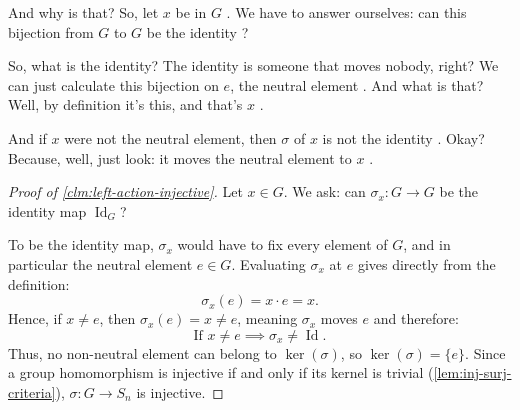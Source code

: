 \begin{proofWrapper}

\begin{speech}[01:14:37 - 01:15:27]
And why is that? So, let $x$ be in $G$ . We have to answer ourselves: can this bijection from $G$ to $G$ be the identity ?

So, what is the identity? The identity is someone that moves nobody, right? We can just calculate this bijection on $e$, the neutral element . And what is that? Well, by definition it's this, and that's $x$ .

And if $x$ were not the neutral element, then $\sigma$ of $x$ is not the identity . Okay? Because, well, just look: it moves the neutral element to $x$ .
\end{speech}

\begin{content}
\begin{proof}[Proof of \cref{clm:left-action-injective}]
Let $x \in G$. We ask: can $\sigma_x \colon G \to G$ be the identity map $\operatorname{Id}_G$?

To be the identity map, $\sigma_x$ would have to fix every element of $G$, and in particular the neutral element $e \in G$. Evaluating $\sigma_x$ at $e$ gives directly from the definition:
\[
\sigma_x(e) = x \cdot e = x.
\]
Hence, if $x \neq e$, then $\sigma_x(e) = x \neq e$, meaning $\sigma_x$ moves $e$ and therefore:
\[
\text{If } x \neq e \implies \sigma_x \neq \operatorname{Id}.
\]
Thus, no non-neutral element can belong to $\ker(\sigma)$, so $\ker(\sigma) = \{e\}$. Since a group homomorphism is injective if and only if its kernel is trivial (\cref{lem:inj-surj-criteria}), $\sigma \colon G \to S_n$ is injective.
\end{proof}


\end{content}
\end{proofWrapper}
